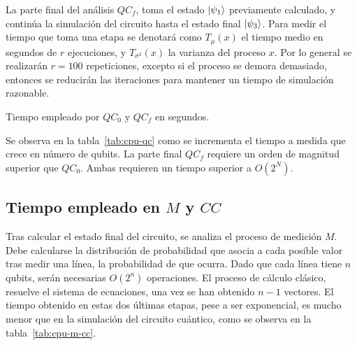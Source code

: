 La parte final del análisis $QC_f$, toma el estado $\ket{\psi_{1}}$ previamente 
calculado, y continúa la simulación del circuito hasta el estado final $\ket{\psi_{3}}$. Para medir el tiempo que toma una etapa se denotará como $T_\mu(x)$ el 
tiempo medio en segundos de $r$ ejecuciones, y $T_{\sigma^2}(x)$ la varianza del 
proceso $x$. Por lo general se realizarán $r = 100$ repeticiones, excepto si el 
proceso se demora demasiado, entonces se reducirán las iteraciones para mantener 
un tiempo de simulación razonable.

\begin{table}[!htb]
\centering
{}
\caption{Tiempo empleado por $QC_0$ y $QC_f$ en segundos.}
\label{tab:cpu-qc}
\end{table}

Se observa en la tabla~\ref{tab:cpu-qc} como se incrementa el tiempo a medida 
que crece en número de qubits. La parte final $QC_f$ requiere un orden de 
magnitud superior que $QC_0$. Ambas requieren un tiempo superior a $O(2^N)$.

\subsection{Tiempo empleado en $M$ y $CC$}
Tras calcular el estado final del circuito, se analiza el proceso de medición 
$M$. Debe calcularse la distribución de probabilidad que asocia a cada posible 
valor tras medir una línea, la probabilidad de que ocurra. Dado que cada línea 
tiene $n$ qubits, serán necesarias $O(2^n)$ operaciones. El proceso de cálculo 
clásico, resuelve el sistema de ecuaciones, una vez se han obtenido $n-1$ 
vectores.
El tiempo obtenido en estas dos últimas etapas, pese a ser exponencial, es mucho 
menor que en la simulación del circuito cuántico, como se observa en la 
tabla~\ref{tab:cpu-m-cc}.

